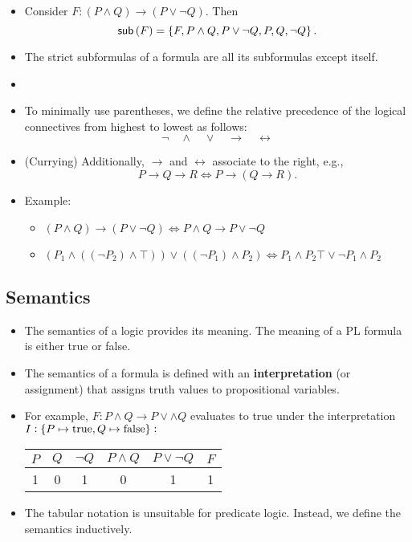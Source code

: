 \begin{itemize}
	\item Consider $F:(P\land Q)\to (P\lor\lnot Q)$. Then \[
	\textsf{sub}\left(F\right)=\set{F,P\land Q,P\lor\lnot Q,P,Q,\lnot Q}.
	\]
	\item The strict subformulas of a formula are all its subformulas except itself.
	\item[]
	\item To minimally use parentheses, we define the relative precedence of the logical connectives from highest to lowest as follows: \[
	\lnot\quad\land\quad\lor\quad\rightarrow\quad\leftrightarrow
	\]
	\item (Currying) Additionally, $\rightarrow$ and $\leftrightarrow$ associate to the right, e.g., \[
	P\to Q\to R\iff P\to(Q\to R).
	\]
	\item Example:
	\begin{itemize}
		\item $(P\land Q)\to (P\lor\lnot Q)\iff P\land Q\to P\lor \lnot Q$
		\item $(P_1\land((\lnot P_2)\land\top))\lor((\lnot P_1)\land P_2)\iff P_1\land P_2\top\lor\lnot P_1\land P_2$
	\end{itemize}
\end{itemize}

\subsection{Semantics}
\begin{itemize}
	\item The semantics of a logic provides its meaning. The meaning of a PL formula is either true or false.
	\item The semantics of a formula is defined with an \textbf{interpretation} (or assignment) that assigns truth values to propositional variables.
	\item For example, $F:P\land Q\to P\lor\land Q$ evaluates to true under the interpretation $I:\set{P\mapsto \text{true},Q\mapsto\text{false}}:$
	\begin{table}[h!]\centering{}
		\begin{tabular}{c|c||c|c|c|c}
			\hline
			$P$ & $Q$ & $\lnot Q$ & $P\land Q$ & $P\lor \lnot Q$ & $F$ \\ \hline
			1 & 0 & 1 & 0 & 1 & 1 \\ \hline
		\end{tabular}
	\end{table}
	\item The tabular notation is unsuitable for predicate logic. Instead, we define the semantics inductively.
\end{itemize}

